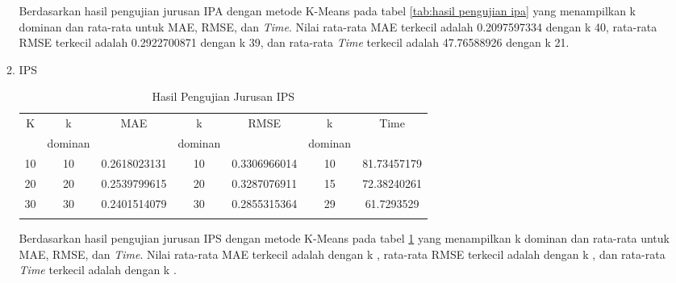 \begin{enumerate}
\begin{enumerate}
                Berdasarkan hasil pengujian jurusan IPA dengan metode K-Means pada tabel \ref{tab:hasil pengujian ipa} yang menampilkan k dominan dan rata-rata untuk MAE, RMSE, dan \textit{Time}. Nilai rata-rata MAE terkecil adalah 0.2097597334 dengan k 40, rata-rata RMSE terkecil adalah 0.2922700871 dengan k 39, dan rata-rata \textit{Time} terkecil adalah 47.76588926 dengan k 21.
                
                
            \item IPS
                \begingroup
                    \renewcommand\arraystretch{1.5}
                    \begin{longtable}{|c|c|c|c|c|c|c|}
                        \hline
                        \multirow{2}{*}{K} & k & MAE & k & RMSE & k & Time \\
                        & dominan & & dominan & & dominan & \\
                        \hline
                        10 & 10 & 0.2618023131 & 10 & 0.3306966014 & 10 & 81.73457179\\
                        \hline
                        20 & 20 & 0.2539799615 & 20 & 0.3287076911 & 15 & 72.38240261\\
                        \hline
                        30 & 30 & 0.2401514079 & 30 & 0.2855315364 & 29 & 61.7293529\\
                        \hline
                        
                        \caption{Hasil Pengujian Jurusan IPS}
                        \label{tab:hasil pengujian ips}
                    \end{longtable}
                \endgroup
                
                Berdasarkan hasil pengujian jurusan IPS dengan metode K-Means pada tabel \ref{tab:hasil pengujian ips} yang menampilkan k dominan dan rata-rata untuk MAE, RMSE, dan \textit{Time}. Nilai rata-rata MAE terkecil adalah  dengan k , rata-rata RMSE terkecil adalah  dengan k , dan rata-rata \textit{Time} terkecil adalah  dengan k .
                
        \end{enumerate}
        
\end{enumerate}
